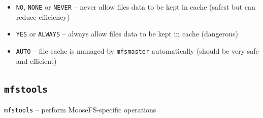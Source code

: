 \documentclass[a4paper,11pt,english]{report}
\def\code#1{\texttt{#1}}
\begin{document}
					\begin{itemize}
						\item \code{NO}, \code{NONE} or \code{NEVER} -- never allow files data to be kept in cache (safest but can reduce efficiency)
						\item \code{YES} or \code{ALWAYS} -- always allow files data to be kept in cache (dangerous)
						\item \code{AUTO} -- file cache is managed by \code{mfsmaster} automatically (should be very safe and efficient)
				\end{itemize}
					
					
			\subsection{\code{mfstools}}
				\code{mfstools} -- perform MooseFS-specific operations
				\bigskip
				
\end{document}
